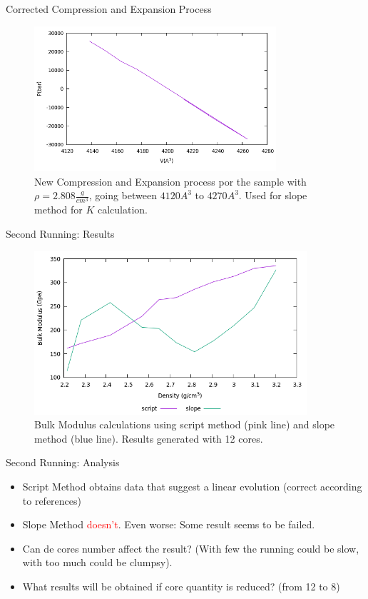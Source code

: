 \documentclass[11pt]{beamer}
\begin{document}
\begin{frame}{Corrected Compression and Expansion Process}
\begin{figure}
 \centering
    \includegraphics[width=0.8\textwidth]{plot-bulk2.png}
 \caption{New Compression and Expansion process por the sample with $\rho=2.808\frac{g}{cm^3}$, going between $4120 A^3$ to $4270 A^3$. Used for slope method for $K$ calculation.}
\end{figure}
\end{frame}
\begin{frame}{Second Running: Results}
\begin{figure}
 \centering
    \includegraphics[width=0.9\textwidth]{plot-yeah2.png}
 \caption{Bulk Modulus calculations using script method (pink line) and slope method (blue line). Results generated with 12 cores.}
\end{figure}
\end{frame}
\begin{frame}{Second Running: Analysis}
\begin{itemize}
    \item Script Method obtains data that suggest a linear evolution (correct according to references)
    \item Slope Method \textcolor{red}{doesn't}. Even worse: Some result seems to be failed.
    \item Can de cores number affect the result? (With few the running could be slow, with too much could be clumpsy).
    \item What results will be obtained if core quantity is reduced? (from 12 to 8)
\end{itemize}
\end{frame}
\end{document}
